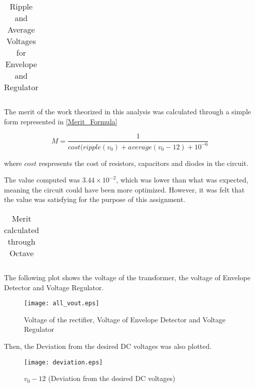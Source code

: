 \begin{table}[H]
    \centering
    \begin{tabular}{|c|c|}
    \hline
        
    \end{tabular}
    \caption{Ripple and Average Voltages for Envelope and Regulator}
    \label{table4a}
\end{table}

\par The merit of the work theorized in this analysis was calculated through a simple form represented in \ref{Merit_Formula}

\begin{equation}
	M = \frac{1}{cost(ripple(v_0)+average(v_0-12)+10^{-6}}
	\label{Merit_Formula}
\end{equation}

where $cost$ respresents the cost of resistors, capacitors and diodes in the circuit.

The value computed was $3.44\times 10^{-2}$, which was lower than what was expected, meaning the circuit could have been more optimized. However, it was felt that the value was satisfying for the purpose of this assignment.

\begin{table}[H]
    \centering
    \begin{tabular}{|c|c|}
    \hline
        
    \end{tabular}
    \caption{Merit calculated through Octave}
    \label{table4a}
\end{table}



\par The following plot shows the voltage of the transformer, the voltage of Envelope Detector and Voltage Regulator.


\begin{figure}[H]
	\texttt{[image: all\_vout.eps]}
	\centering
	\caption{Voltage of the rectifier, Voltage of Envelope Detector and Voltage Regulator}
	\label{pha}
\end{figure}

\par Then, the Deviation from the desired DC voltages was also plotted.
\begin{figure}[H]
	\texttt{[image: deviation.eps]}
	\centering
	\caption{$v_0-12$ (Deviation from the desired DC voltages)}
	\label{pha}
\end{figure}



